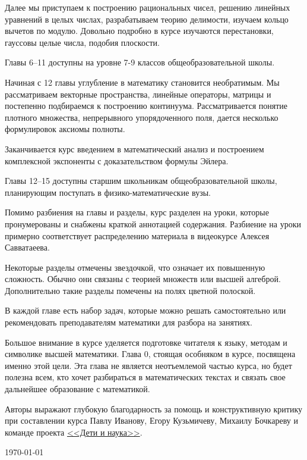 Далее мы приступаем к построению рациональных чисел, решению линейных уравнений в целых числах, разрабатываем теорию делимости, изучаем кольцо вычетов по модулю. Довольно подробно в курсе изучаются перестановки, гауссовы целые числа, подобия плоскости.

Главы 6--11 доступны на уровне 7-9 классов общеобразовательной школы.

Начиная с 12 главы углубление в математику становится необратимым. Мы рассматриваем векторные пространства, линейные операторы, матрицы и постепенно подбираемся к построению континуума. Рассматривается понятие плотного множества, непрерывного упорядоченного поля, дается несколько формулировок аксиомы полноты.

Заканчивается курс введением в математический анализ и построением комплексной экспоненты с доказательством формулы Эйлера.

Главы 12--15 доступны старшим школьникам общеобразовательной школы, планирующим поступать в физико-математические вузы.


Помимо разбиения на главы и разделы, курс разделен на уроки, которые пронумерованы и снабжены краткой аннотацией содержания. Разбиение на уроки примерно соответствует распределению материала в видеокурсе Алексея Савватаеева.

Некоторые разделы отмечены звездочкой, что означает их повышенную сложность. Обычно они связаны с теорией множеств или высшей алгеброй. Дополнительно такие разделы помечены на полях цветной полоской.

В каждой главе есть набор задач, которые можно решать самостоятельно или рекомендовать преподавателям математики для разбора на занятиях. 

Большое внимание в курсе уделяется подготовке читателя к языку, методам и символике высшей математики. Глава 0, стоящая особняком в курсе, посвящена именно этой цели. Эта глава не является неотъемлемой частью курса, но будет полезна всем, кто хочет разбираться в математических текстах и связать свое дальнейшее образование с математикой.

Авторы выражают глубокую благодарность за помощь и конструктивную критику при составлении курса Павлу Иванову, Егору Кузьмичеву, Михаилу Бочкареву и команде проекта \href{http://childrenscience.ru/}{<<Дети и наука>>}.

\quad

\quad \hfill \today



